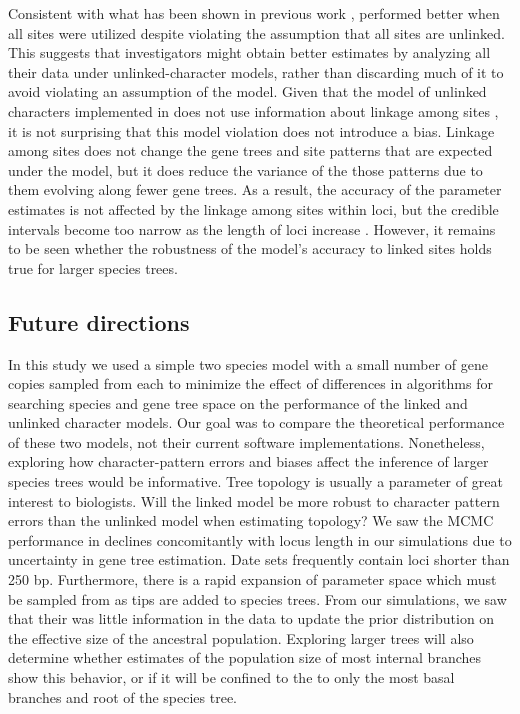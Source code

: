 Consistent with what has been shown in previous work
\citep{Oaks2018ecoevolity,oaks2019comparative},
\ecoevolity performed better when all sites were utilized despite violating the
assumption that all sites are unlinked.
This suggests that investigators might obtain better estimates by analyzing all
their data under unlinked-character models, rather than discarding much of it
to avoid violating an assumption of the model.
Given that the model of unlinked characters implemented in \ecoevolity
does not use information about linkage among sites 
\citep{bryantInferringSpeciesTrees2012, Oaks2018ecoevolity},
it is not surprising that this model violation does not introduce a bias.
Linkage among sites does not change the gene trees and site patterns that are
expected under the model, but it does reduce the variance of the those patterns
due to them evolving along fewer gene trees.
As a result, the accuracy of the parameter estimates is not affected
by the linkage among sites within loci, but the credible intervals
become too narrow as the length of loci increase
\citep{Oaks2018ecoevolity,oaks2019comparative}.
However, it remains to be seen whether the robustness of the model's accuracy
to linked sites holds true for larger species trees.


\subsection{Future directions}
In this study we used a simple two species model with a small number of gene
copies sampled from each to minimize the effect of differences in algorithms
for searching species and gene tree space on the performance of the linked and
unlinked character models.
Our goal was to compare the theoretical performance of these two models, not
their current software implementations.
Nonetheless, exploring how character-pattern errors and biases affect
the inference of larger species trees would be informative.
Tree topology is usually a parameter of great interest to biologists. Will 
the linked model be more robust to character pattern errors than the unlinked 
model when estimating topology? We saw the MCMC performance in \beast declines 
concomitantly with locus length in our simulations due to uncertainty in gene 
tree estimation. Date sets frequently contain loci shorter than 250 bp. Furthermore,
there is a rapid expansion of parameter space which must be sampled from as tips are 
added to species trees. From our simulations, we saw that their was little information in the data to
update the prior distribution on the effective size of the ancestral population.
Exploring larger trees will also determine whether estimates of the population size
of most internal branches show this behavior, or if it will be confined to the
to only the most basal branches and root of the species tree.


